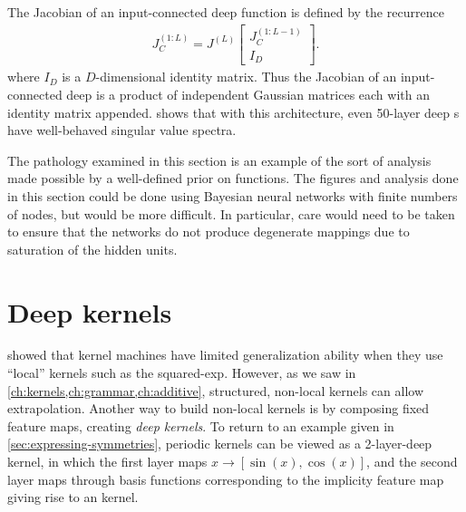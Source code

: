The Jacobian of an input-connected deep function is defined by the recurrence
%
\newcommand{\sbi}[2]{\left[ \! \begin{array}{c} #1 \\ #2 \end{array} \! \right]} 
\begin{align}
{J_C^{(1:L)} = J^{(L)} \sbi{ J_C^{(1:L-1)}}{I_D}}.
\end{align}
%
%
%
where $I_D$ is a $D$-dimensional identity matrix.
Thus the Jacobian of an input-connected deep \gp{} is a product of independent Gaussian matrices each with an identity matrix appended.
 shows that with this architecture, even 50-layer deep \gp{}s have well-behaved singular value spectra.

The pathology examined in this section is an example of the sort of analysis made possible by a well-defined prior on functions.
The figures and analysis done in this section could be done using Bayesian neural networks with finite numbers of nodes, but would be more difficult.
In particular, care would need to be taken to ensure that the networks do not produce degenerate mappings due to saturation of the hidden units.





\section{Deep kernels}
\label{sec:deep_kernels}

\cite{ bengio2006curse} showed that kernel machines have limited generalization ability when they use ``local'' kernels such as the squared-exp.
However, as we saw in \cref{ch:kernels,ch:grammar,ch:additive}, structured, non-local kernels can 
allow extrapolation.
Another way to build non-local kernels is by composing fixed feature maps, creating \emph{deep kernels}.
To return to an example given in \cref{sec:expressing-symmetries}, periodic kernels can be viewed as a 2-layer-deep kernel, in which the first layer maps $x \rightarrow [\sin(x), \cos(x)]$, and the second layer maps through basis functions corresponding to the implicity feature map giving rise to an \kSE{} kernel.

